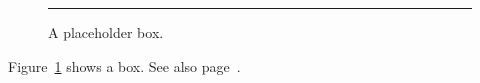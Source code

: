 \documentclass{article}
\begin{document}
\begin{figure}[h]
  \centering
  \rule{4cm}{2cm}
  \caption{A placeholder box.}\label{fig:box}
\end{figure}
Figure~\ref{fig:box} shows a box. See also page~\pageref{fig:box}.
\end{document}
